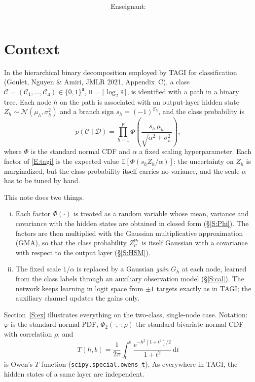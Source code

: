 \documentclass[letterpaper]{article}
\author{\courseS \\ \deptS\\ Enseignant: \profS\\[6pt] \dateS}
\date{}
\newcommand{\titleS}{~}
\begin{document}
\title{\titleS }

\section{Context}\label{S:Context}
In the hierarchical binary decomposition employed by TAGI for classification (Goulet, Nguyen \& Amiri, JMLR 2021, Appendix~C), a class $\mathcal C=(\mathcal C_1,\dots,\mathcal C_{\mathtt H})\in\{0,1\}^{\mathtt H}$, $\mathtt H=\lceil\log_2\mathtt K\rceil$, is identified with a path in a binary tree. Each node $h$ on the path is associated with an output-layer hidden state $Z_h\sim\mathcal N(\mu_h,\sigma_h^2)$ and a branch sign $s_h=(-1)^{\mathcal C_h}$, and the class probability is
\begin{equation}
p(\mathcal C\mid\mathcal D)=\prod_{h=1}^{\mathtt H}\Phi\!\left(\frac{s_h\,\mu_h}{\sqrt{\alpha^2+\sigma_h^2}}\right),
\label{E:tagi}
\end{equation}
where $\Phi$ is the standard normal CDF and $\alpha$ a fixed scaling hyperparameter. Each factor of \eqref{E:tagi} is the expected value $\mathbb E[\Phi(s_hZ_h/\alpha)]$: the uncertainty on $Z_h$ is marginalized, but the class probability itself carries no variance, and the scale $\alpha$ has to be tuned by hand.

This note does two things.
\begin{enumerate}[(i)]
\item Each factor $\Phi(\cdot)$ is treated as a random variable whose mean, variance and covariance with the hidden states are obtained in closed form (\S\ref{S:Phi}). The factors are then multiplied with the Gaussian multiplicative approximation (GMA), so that the class probability $Z^{\Pr}_{\mathcal C}$ is itself Gaussian with a covariance with respect to the output layer (\S\ref{S:HSM}).
\item The fixed scale $1/\alpha$ is replaced by a Gaussian \emph{gain} $G_h$ at each node, learned from the class labels through an auxiliary observation model (\S\ref{S:cal}). The network keeps learning in logit space from $\pm1$ targets exactly as in TAGI; the auxiliary channel updates the gains only.
\end{enumerate}
Section~\ref{S:ex} illustrates everything on the two-class, single-node case. Notation: $\varphi$ is the standard normal PDF, $\Phi_2(\cdot,\cdot;\rho)$ the standard bivariate normal CDF with correlation $\rho$, and
\begin{equation}
T(h,b)=\frac{1}{2\pi}\int_0^{b}\frac{e^{-h^2(1+t^2)/2}}{1+t^2}\,\mathrm dt
\end{equation}
is Owen's $T$ function (\texttt{scipy.special.owens\_t}). As everywhere in TAGI, the hidden states of a same layer are independent.
\end{document}

